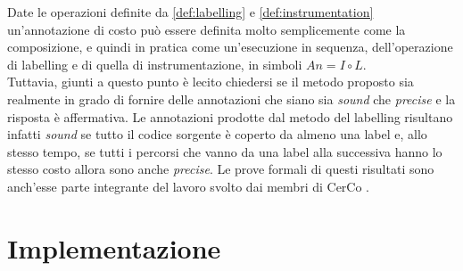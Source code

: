 \documentclass[12pt,a4paper,openright,oneside]{report}
\theoremstyle{definition}
\begin{document}
Date le operazioni definite da \ref{def:labelling} e \ref{def:instrumentation} un'annotazione di costo pu\`{o} essere definita molto semplicemente come la composizione, e quindi in pratica come un'esecuzione in sequenza, dell'operazione di labelling e di quella di instrumentazione, in simboli $An = I \circ L$.\\
Tuttavia, giunti a questo punto \`{e} lecito chiedersi se il metodo proposto sia realmente in grado di fornire delle annotazioni che siano sia \textit{sound} che \textit{precise} e la risposta \`{e} affermativa. Le annotazioni prodotte dal metodo del labelling risultano infatti \textit{sound} se tutto il codice sorgente \`{e} coperto da almeno una label e, allo stesso tempo, se tutti i percorsi che vanno da una label alla successiva hanno lo stesso costo allora sono anche \textit{precise}. Le prove formali di questi risultati sono anch'esse parte integrante del lavoro svolto dai membri di CerCo \cite{cerco_website}.

\chapter{Implementazione}\label{impl}
\end{document}
